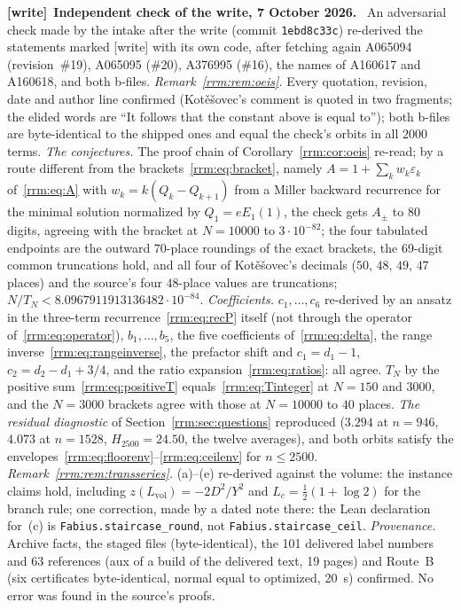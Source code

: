 \documentclass[11pt]{article}
\theoremstyle{remark}\newtheorem{remark}[theorem]{Remark}
\newcommand{\eps}{\varepsilon}
\newcommand{\file}[1]{\nolinkurl{#1}}
\newenvironment{writenote}[1][]{\par\smallskip\begingroup\small
 \noindent\textbf{[write]}\if\relax\detokenize{#1}\relax\else~\textbf{#1.}\fi\ }%
 {\par\endgroup\smallskip}
\begin{document}
\begin{writenote}[Independent check of the write, 7 October 2026]
An adversarial check made by the intake after the write (commit
\file{1ebd8c33c}) re-derived the statements marked [write] with its own code,
after fetching again A065094 (revision~\#19), A065095 (\#20), A376995
(\#16), the names of A160617 and A160618, and both b-files.
\emph{Remark~\ref{rrm:rem:oeis}.} Every quotation, revision, date and author
line confirmed (Kot\v{e}\v{s}ovec's comment is quoted in two fragments; the
elided words are ``It follows that the constant above is equal to''); both
b-files are byte-identical to the shipped ones and equal the check's orbits
in all $2000$ terms. \emph{The conjectures.} The proof chain of
Corollary~\ref{rrm:cor:oeis} re-read; by a route different from the
brackets~\eqref{rrm:eq:bracket}, namely $A=1+\sum_kw_k\eps_k$
of~\eqref{rrm:eq:A} with $w_k=k(Q_k-Q_{k+1})$ from a Miller backward
recurrence for the minimal solution normalized by $Q_1=eE_1(1)$, the check
gets $A_\pm$ to $80$ digits, agreeing with the bracket at $N=10000$ to
$3\cdot10^{-82}$; the four tabulated endpoints are the outward $70$-place
roundings of the exact brackets, the 69-digit common truncations hold, and
all four of Kot\v{e}\v{s}ovec's decimals ($50$, $48$, $49$, $47$ places) and
the source's four $48$-place values are truncations; $N/T_N<8.0967911913136482\cdot10^{-84}$.
\emph{Coefficients.} $c_1,\dots,c_6$ re-derived by an ansatz in the three-term
recurrence~\eqref{rrm:eq:recP} itself (not through the operator
of~\eqref{rrm:eq:operator}), $b_1,\dots,b_5$, the five coefficients
of~\eqref{rrm:eq:delta}, the range inverse~\eqref{rrm:eq:rangeinverse}, the
prefactor shift and $c_1=d_1-1$, $c_2=d_2-d_1+3/4$, and the ratio
expansion~\eqref{rrm:eq:ratios}: all agree. $T_N$ by the positive
sum~\eqref{rrm:eq:positiveT} equals~\eqref{rrm:eq:Tinteger} at $N=150$ and
$3000$, and the $N=3000$ brackets agree with those at $N=10000$ to $40$
places. \emph{The residual diagnostic} of Section~\ref{rrm:sec:questions}
reproduced ($3.294$ at $n=946$, $4.073$ at $n=1528$, $H_{2500}=24.50$, the
twelve averages), and both orbits satisfy the
envelopes~\eqref{rrm:eq:floorenv}--\eqref{rrm:eq:ceilenv} for $n\le2500$.
\emph{Remark~\ref{rrm:rem:transseries}.} (a)--(e) re-derived against the
volume: the instance claims hold, including $z(L_{\mathrm{vol}})=-2D^2/Y^2$
and $L_c=\tfrac12(1+\log2)$ for the branch rule; one correction, made by a
dated note there: the Lean declaration for~(c) is
\file{Fabius.staircase_round}, not \file{Fabius.staircase_ceil}.
\emph{Provenance.} Archive facts, the staged files (byte-identical), the 101
delivered label numbers and 63 references (aux of a build of the delivered
text, 19 pages) and Route~B (six certificates byte-identical, normal equal to
optimized, 20~s) confirmed. No error was found in the source's proofs.
\end{writenote}
\end{document}

